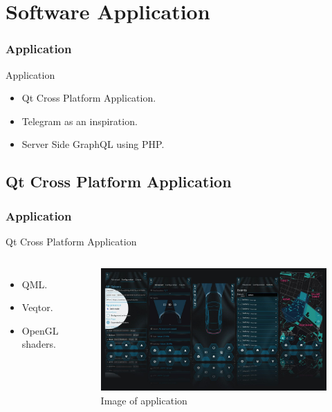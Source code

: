 \documentclass[aspectratio=169,11pt]{beamer}
\begin{document}
	\section{Software Application}
	\begin{frame}
		\frametitle{Application}
		\begin{block}{Application}
			\begin{itemize}
				\item Qt Cross Platform Application.\cite{QtQML51548:online}
				\item Telegram as an inspiration.
				\item Server Side GraphQL using PHP.\cite{GraphQL:online}
			\end{itemize}
		\end{block}
	\end{frame}

	\subsection{Qt Cross Platform Application}
	\begin{frame}
		\frametitle{Application}
		\begin{block}{Qt Cross Platform Application}
			\begin{columns}[c]
				\column{.35\textwidth}
				\begin{itemize}
					\item QML.
					\item Veqtor.
					\item OpenGL shaders.
				\end{itemize}
				\column{.55\textwidth}
				\begin{figure}[!h]
					\centering
					\includegraphics[width=\textwidth]{../latex/images/preview-dark.jpeg}
					\caption{Image of application}
				\end{figure}
			\end{columns}
		\end{block}
	\end{frame}
\end{document}
